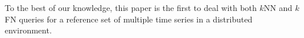 To the best of our knowledge, this paper is the first to deal with both $k$NN
and $k$FN queries for a reference set of multiple time series in a
distributed environment.

